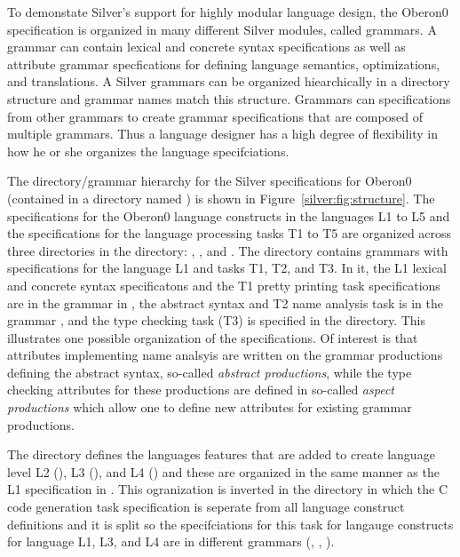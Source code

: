 To demonstate Silver's support for highly modular language design, the
Oberon0 specification is organized in many different Silver modules,
called grammars.
%
A grammar can contain lexical and concrete syntax specifications as
well as attribute grammar specfications for defining language
semantics, optimizations, and translations.  
%
A Silver grammars can be organized hiearchically in a directory
structure and grammar names match this structure.  
%
%
Grammars can  specifications from other grammars to
create grammar specifications that are composed of multiple grammars. 
%
Thus a language designer has a high degree of flexibility in how he or
she organizes the language specifciations.

The directory/grammar hierarchy for the Silver specifications for
Oberon0 (contained in a directory named ) is shown in
Figure~\ref{silver:fig:structure}.  The specifications for the Oberon0
language constructs in the languages L1 to L5 and the specifications
for the language processing tasks T1 to T5 are organized across three
directories in the  directory: ,
, and .
%
The  directory contains grammars with specifications for
the language L1 and tasks T1, T2, and T3.
%
In it, the L1 lexical and concrete syntax specificatons and the T1 pretty
printing task specifications are in the grammar in
, the abstract syntax and T2 name analysis task
is in the grammar , and the type checking task
(T3) is specified in the  directory.
%
This illustrates one possible organization of the specifications.  Of
interest is that attributes implementing name analsyis are written
on the grammar productions defining the abstract syntax, so-called
\emph{abstract productions}, while the type
checking attributes for these productions are defined in so-called
\emph{aspect productions} which allow one to define new attributes for
existing grammar productions.

The  directory defines the languages features that
are added to create language level L2 (), L3
(), and L4 () and these are 
organized in the same manner as the L1 specification in .
%
This ogranization is inverted in the  directory
in which the C code generation task specification is seperate from all
language construct definitions and it is split so the specifciations
for this task for langauge constructs for language L1, L3, and L4 are
in different grammars (, ,
).

